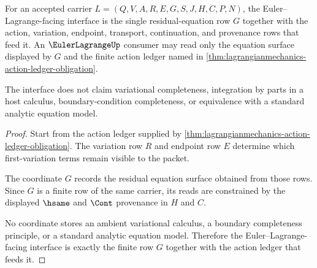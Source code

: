 \begin{theorem}
\label{thm:lagrangianmechanics-eulerlagrange-interface}
For an accepted carrier $L=(Q,V,A,R,E,G,S,J,H,C,P,N)$, the
Euler--Lagrange-facing interface is the single residual-equation row $G$
together with the action, variation, endpoint, transport, continuation, and
provenance rows that feed it. An $\EulerLagrangeUp$ consumer may read only the
equation surface displayed by $G$ and the finite action ledger named in
\autoref{thm:lagrangianmechanics-action-ledger-obligation}.

The interface does not claim variational completeness, integration by parts in
a host calculus, boundary-condition completeness, or equivalence with a
standard analytic equation model.
\end{theorem}
\begin{proof}
Start from the action ledger supplied by
\autoref{thm:lagrangianmechanics-action-ledger-obligation}. The variation row
$R$ and endpoint row $E$ determine which first-variation terms remain visible
to the packet.

The coordinate $G$ records the residual equation surface obtained from those
rows. Since $G$ is a finite row of the same carrier, its reads are constrained
by the displayed $\hsame$ and $\Cont$ provenance in $H$ and $C$.

No coordinate stores an ambient variational calculus, a boundary completeness
principle, or a standard analytic equation model. Therefore the
Euler--Lagrange-facing interface is exactly the finite row $G$ together with
the action ledger that feeds it.
\end{proof}

